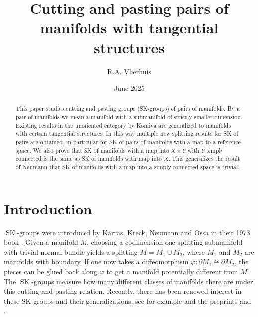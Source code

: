 \documentclass{amsart}
\title{Cutting and pasting pairs of manifolds with tangential structures}
\author{R.A. Vlierhuis}
\date{June 2025}
\theoremstyle{definition}
\theoremstyle{remark}
\newcommand{\de}{\partial}
\newcommand{\SK}{\operatorname{SK}}
\begin{document}
\begin{abstract}
    This paper studies cutting and pasting groups (SK-groups) of pairs of manifolds. By a pair of manifolds we mean a manifold with a submanifold of strictly smaller dimension. Existing results in the unoriented category by Komiya are generalized to manifolds with certain tangential structures. In this way multiple new splitting results for SK of pairs are obtained, in particular for SK of pairs of manifolds with a map to a reference space. We also prove that SK of manifolds with a map into $X\times Y$ with $Y$ simply connected is the same as SK of manifolds with map into $X$. This generalizes the result of Neumann that SK of manifolds with a map into a simply connected space is trivial.
\end{abstract}
\maketitle
\section{Introduction}
$\SK$-groups were introduced by Karras, Kreck, Neumann and Ossa in  their 1973 book \cite{skbook}. Given a manifold $M$, choosing a codimension one splitting submanifold with trivial normal bundle yields a splitting $M = M_1 \cup M_2$, where $M_1$ and $M_2$ are manifolds with boundary. If one now takes a diffeomorphism $\varphi: \de M_1 \cong \de M_2$, the pieces can be glued back along $\varphi$ to get a manifold potentially different from $M$. The $\SK$-groups measure how many different classes of manifolds there are under this cutting and pasting relation. Recently, there has been renewed interest in these SK-groups and their generalizations, see for example \cite{HOEKZEMA2022108105} and the preprints \cite{hoekzema2025} and \cite{merling2025}.
\end{document}
